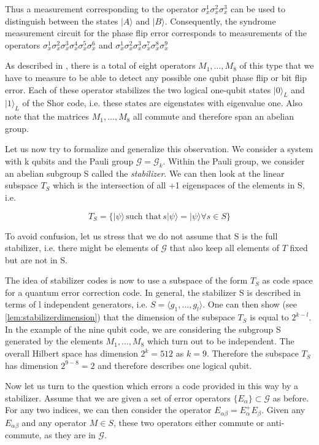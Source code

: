 \documentclass[a4paper, draft]{article}
\theoremstyle{own}
\theoremstyle{remark}
\begin{document}
Thus a measurement corresponding to the operator $\sigma_x^1 \sigma_x^2 \sigma_x^3$ can be used to distinguish between the states $|A \rangle $ and $|B \rangle$. Consequently, the syndrome measurement circuit for the phase flip error corresponds to measurements of the operators $\sigma_x^1\sigma_x^2 \sigma_x^3 \sigma_x^4 \sigma_x^5 \sigma_x^6$ and $\sigma_x^1\sigma_x^2 \sigma_x^3 \sigma_x^7 \sigma_x^8 \sigma_x^9$

As described in \cite{GThesis}, there is a total of eight operators $M_1, \dots, M_8$ of this type that we have to measure to be able to detect any possible one qubit phase flip or bit flip error. Each of these operator stabilizes the two logical one-qubit states $|0 \rangle_L$ and $|1\rangle_L$ of the Shor code, i.e. these states are eigenstates with eigenvalue one. Also note that the matrices $M_1, \dots, M_8$ all commute and therefore span an abelian group.

Let us now try to formalize and generalize this observation. We consider a system with k qubits and the Pauli group $\mathcal G = \mathcal{G}_k$. Within the Pauli group, we consider an abelian subgroup S called the \emph{stabilizer}. We can then look at the linear subspace $T_S$ which is the intersection of all +1 eigenspaces of the elements in S, i.e.

$$
T_S = \{ |\psi \rangle \, \text{such that} \, s|\psi \rangle = |\psi \rangle 
\forall s \in S \}
$$

To avoid confusion, let us stress that we do not assume that S is the full stabilizer, i.e. there might be elements of $\mathcal{G}$ that also keep all elements of $T$ fixed but are not in S. 

The idea of stabilizer codes is now to use a subspace of the form $T_S$ as code space for a quantum error correction code. In general, the stabilizer S is described in terms of l independent generators, i.e. $S = \langle g_1, \dots, g_l \rangle$. One can then show (see \ref{lem:stabilizerdimension}) that the dimension of the subspace $T_S$ is equal to $2^{k-l}$. In the example of the nine qubit code, we are considering the subgroup S generated by the elements $M_1, \dots, M_8$ which turn out to be independent. The overall Hilbert space has dimension $2^k = 512$ as $k = 9$. Therefore the subspace $T_S$ has dimension $2^{9 - 8} = 2$ and therefore describes one logical qubit. 

Now let us turn to the question which errors a code provided in this way by a stabilizer. Assume that we are given a set of error operators $\{ E_\alpha \} \subset \mathcal{G}$ as before. For any two indices, we can then consider the operator $E_{\alpha \beta} = E_\alpha^+ E_\beta$. Given any $E_{\alpha \beta}$ and any operator $M \in S$, these two operators either commute or anti-commute, as they are in $\mathcal{G}$. 
\end{document}
